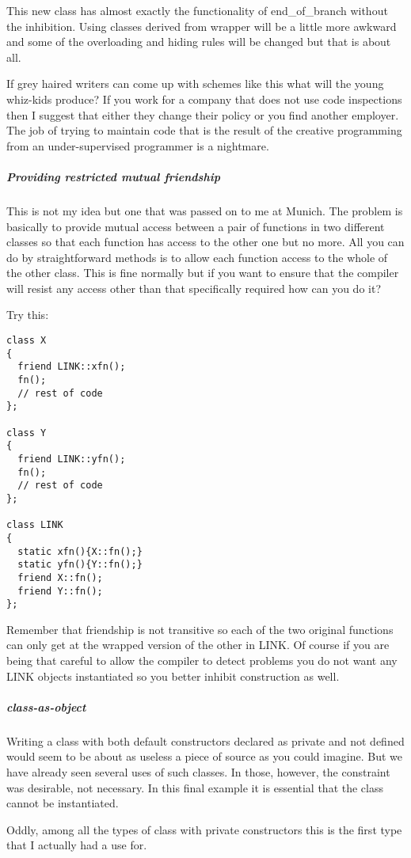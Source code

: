 \documentclass{book}
\begin{document}
This  new class  has almost  exactly the functionality of end\_of\_branch without the inhibition. 
Using classes derived from wrapper will be a little more awkward and some of the overloading and hiding rules will be changed but that is about all.

If grey haired writers can come up with schemes like this what will the young whiz-kids produce? 
If you work for a company that does not use code inspections then I suggest that either they change their policy or you find another employer.
The job of trying to maintain code that is the result of the creative programming from an under-supervised programmer is a nightmare.
\subparagraph{Providing restricted mutual friendship}

This is not my idea but one that was passed on to me at Munich. 
The problem is basically to provide mutual access between a pair of functions in two different classes so that each function has access to the other one but no more.
All you can do by straightforward methods is to allow each function access to the whole of the other class. 
This is fine normally but if you want to ensure that the compiler will resist any access other than that specifically required how can you do it?

Try this:

\begin{lstlisting}
class X 
{
  friend LINK::xfn();
  fn();
  // rest of code 
};

class Y 
{
  friend LINK::yfn();
  fn(); 
  // rest of code
};

class LINK 
{
  static xfn(){X::fn();}
  static yfn(){Y::fn();} 
  friend X::fn(); 
  friend Y::fn(); 
};
\end{lstlisting}

Remember that friendship is not transitive so each of the two original functions can only get at the wrapped version of the other in LINK.
Of course if you are being that careful to allow the compiler to detect problems you do not want any LINK objects instantiated so you better inhibit construction as well.
\subparagraph{class-as-object}

Writing a class with both default constructors declared as private and not defined would seem to be about as useless a piece of source as you could imagine.
But we have already seen several uses of such classes. In those, however, the constraint was desirable, not necessary.
In this final example it is essential that the class cannot be instantiated.

Oddly, among all the types of class with private constructors this is the first type that I actually had a use for.
\end{document}
